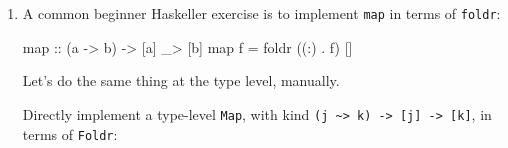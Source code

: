 \documentclass[]{article}
\newenvironment{Shaded}{}{}
\newcommand{\CommentTok}[1]{\textcolor[rgb]{0.38,0.63,0.69}{\textit{#1}}}
\newcommand{\DataTypeTok}[1]{\textcolor[rgb]{0.56,0.13,0.00}{#1}}
\newcommand{\DecValTok}[1]{\textcolor[rgb]{0.25,0.63,0.44}{#1}}
\newcommand{\FunctionTok}[1]{\textcolor[rgb]{0.02,0.16,0.49}{#1}}
\newcommand{\KeywordTok}[1]{\textcolor[rgb]{0.00,0.44,0.13}{\textbf{#1}}}
\newcommand{\NormalTok}[1]{#1}
\newcommand{\OperatorTok}[1]{\textcolor[rgb]{0.40,0.40,0.40}{#1}}
\newcommand{\OtherTok}[1]{\textcolor[rgb]{0.00,0.44,0.13}{#1}}
\renewcommand{\href}[2]{#2\footnote{\url{#1}}}
\begin{document}
\begin{enumerate}
  Write a similar type \texttt{IsOdd\ n} that can only be constructed if
  \texttt{n} is \emph{odd}.

\begin{Shaded}
\begin{Highlighting}[]
\KeywordTok{type} \DataTypeTok{IsOdd}\NormalTok{ n }\OtherTok{=} \DataTypeTok{Sigma} \DataTypeTok{Nat}\NormalTok{ (}\OperatorTok{????}\NormalTok{ n)}
\end{Highlighting}
\end{Shaded}

  And construct a proof that \texttt{7} is odd:

\begin{Shaded}
\begin{Highlighting}[]
\CommentTok{{-}{-} source: https://github.com/mstksg/inCode/tree/master/code{-}samples/singletons/Door4Final.hs\#L226{-}L226}

\OtherTok{sevenIsOdd ::} \DataTypeTok{IsOdd} \DecValTok{7}
\end{Highlighting}
\end{Shaded}

  \href{https://github.com/mstksg/inCode/tree/master/code-samples/singletons/Door4Final.hs\#L220-L220}{Solution
  here!}

  On a sad note, one exercise I'd like to be able to add is to ask you to write
  decision functions and proofs for \texttt{IsEven} and \texttt{IsOdd}.
  Unfortunately, \texttt{Nat} is not rich enough to support this out of the box
  without a lot of extra tooling!
\item
  A common beginner Haskeller exercise is to implement \texttt{map} in terms of
  \texttt{foldr}:

\begin{Shaded}
\begin{Highlighting}[]
\FunctionTok{map}\OtherTok{ ::}\NormalTok{ (a }\OtherTok{{-}\textgreater{}}\NormalTok{ b) }\OtherTok{{-}\textgreater{}}\NormalTok{ [a] \_}\OperatorTok{\textgreater{}}\NormalTok{ [b]}
\FunctionTok{map}\NormalTok{ f }\OtherTok{=} \FunctionTok{foldr}\NormalTok{ ((}\OperatorTok{:}\NormalTok{) }\OperatorTok{.}\NormalTok{ f) []}
\end{Highlighting}
\end{Shaded}

  Let's do the same thing at the type level, manually.

  Directly implement a type-level \texttt{Map}, with kind
  \texttt{(j\ \textasciitilde{}\textgreater{}\ k)\ -\textgreater{}\ {[}j{]}\ -\textgreater{}\ {[}k{]}},
  in terms of \texttt{Foldr}:


\end{enumerate}
\end{document}
